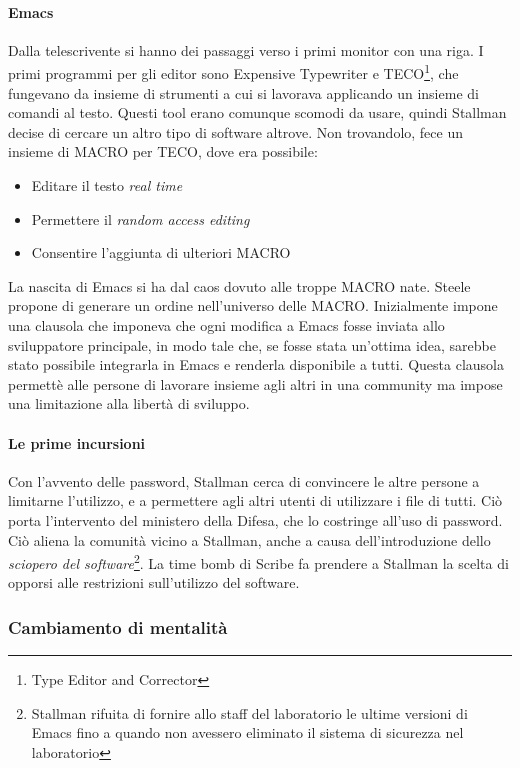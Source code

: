 \paragraph*{Emacs} Dalla telescrivente si hanno dei passaggi verso i primi monitor con una riga. I primi programmi per gli editor sono Expensive Typewriter e TECO\footnote{Type Editor and Corrector}, che fungevano da insieme di strumenti a cui si lavorava applicando un insieme di comandi al testo. Questi tool erano comunque scomodi da usare, quindi Stallman decise di cercare un altro tipo di software altrove. Non trovandolo, fece un insieme di MACRO per TECO, dove era possibile:
\begin{itemize}
  
\item Editare il testo \textit{real time}
\item Permettere il \textit{random access editing}
\item Consentire l'aggiunta di ulteriori MACRO

\end{itemize}

La nascita di Emacs si ha dal caos dovuto alle troppe MACRO nate. Steele propone di generare un ordine nell'universo delle MACRO. Inizialmente impone una clausola che imponeva che ogni modifica a Emacs fosse inviata allo sviluppatore principale, in modo tale che, se fosse stata un'ottima idea, sarebbe stato possibile integrarla in Emacs e renderla disponibile a tutti. Questa clausola permett\`e alle persone di lavorare insieme agli altri in una community ma impose una limitazione alla libert\`a di sviluppo.

\paragraph*{Le prime incursioni} Con l'avvento delle password, Stallman cerca di convincere le altre persone a limitarne l'utilizzo, e a permettere agli altri utenti di utilizzare i file di tutti. Ci\`o porta l'intervento del ministero della Difesa, che lo costringe all'uso di password. Ci\`o aliena la comunit\`a vicino a Stallman, anche a causa dell'introduzione dello \textit{sciopero del software}\footnote{Stallman rifuita di fornire allo staff del laboratorio le ultime versioni di Emacs fino a quando non avessero eliminato il sistema di sicurezza nel laboratorio}. La time bomb di Scribe fa prendere a Stallman la scelta di opporsi alle restrizioni sull'utilizzo del software.

\subsubsection{Cambiamento di mentalit\`a}

